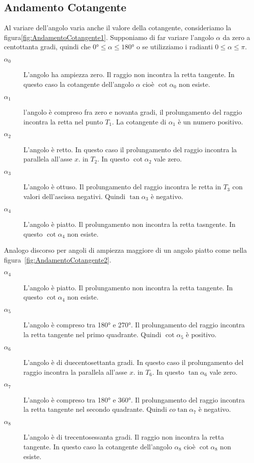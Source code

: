 \subsection{Andamento Cotangente}\label{sec:AndamentoCotangente}
Al variare dell'angolo varia anche il valore della cotangente, consideriamo la figura\nobs\vref{fig:AndamentoCotangente1}. Supponiamo di far variare l'angolo $\alpha$ da zero a centottanta gradi, quindi che $\ang{0}\leq\alpha\leq\ang{180}$ o se utilizziamo i radianti $0\leq\alpha\leq\pi$.
\begin{figure}
	\centering
	
	\label{fig:AndamentoCotangente1}
\end{figure}%
\begin{description}
	\item[$\alpha_0$] L'angolo ha ampiezza zero. Il raggio non incontra la retta tangente. In questo caso  la cotangente  dell'angolo $\alpha$ cioè $\cot\alpha_0$  non esiste.
	\item [$\alpha_1$] l'angolo è compreso fra zero e novanta gradi, il prolungamento del raggio  incontra la retta nel punto $T_1$. La cotangente di $\alpha_1$ è un numero positivo.
	\item [$\alpha_2$] L'angolo  è retto. In questo caso il prolungamento del raggio incontra la parallela all'asse $x$. in $T_2$. In questo    $\cot\alpha_2$ vale zero. 
	\item [$\alpha_3$]  L'angolo è ottuso. Il prolungamento del raggio incontra le retta in $T_3$  con valori dell'ascissa negativi. Quindi $\tan\alpha_3$ è negativo.
	\item [$\alpha_4$] L'angolo  è  piatto. Il  prolungamento non incontra la retta tasngente. In questo  $\cot\alpha_4$ non esiste.
\end{description}
Analogo discorso per angoli di ampiezza  maggiore di un angolo  piatto come nella figura~\vref{fig:AndamentoCotangente2}.
\begin{description}
	\item [$\alpha_4$] L'angolo  è  piatto. Il  prolungamento non incontra la retta tangente. In questo  $\cot\alpha_4$ non esiste.
	\item [$\alpha_5$] L'angolo è compreso tra \ang{180} e \ang{270}. Il prolungamento del raggio incontra la retta tangente  nel primo quadrante. Quindi $\cot\alpha_5$ è positivo.
	\item [$\alpha_6$] L'angolo è di duecentosettanta gradi.  In questo caso il prolungamento del raggio incontra la parallela all'asse $x$. in $T_6$. In questo    $\tan\alpha_6$ vale zero. 
	\item [$\alpha_7$] L'angolo è compreso tra \ang{180} e \ang{360}. Il prolungamento del raggio incontra la retta tangente nel secondo quadrante. Quindi $co\tan\alpha_7$ è negativo.
	\item [$\alpha_8$] L'angolo è di trecentosessanta gradi. Il raggio non incontra la retta tangente. In questo caso  la cotangente  dell'angolo $\alpha_8$ cioè $\cot\alpha_8$  non esiste.
\end{description}
